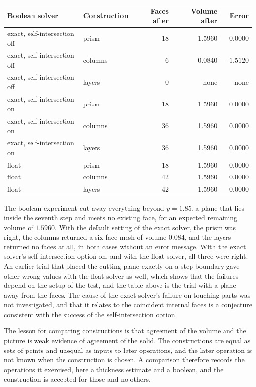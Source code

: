 \begin{center}
\small
\setlength{\tabcolsep}{4pt}
\begin{tabular}{llrrr}
\toprule
Boolean solver & Construction & Faces after & Volume after & Error\\
\midrule
exact, self-intersection off & prism & 18 & 1.5960 & 0.0000\\
exact, self-intersection off & columns & 6 & 0.0840 & $-1.5120$\\
exact, self-intersection off & layers & 0 & none & none\\
exact, self-intersection on & prism & 18 & 1.5960 & 0.0000\\
exact, self-intersection on & columns & 36 & 1.5960 & 0.0000\\
exact, self-intersection on & layers & 36 & 1.5960 & 0.0000\\
float & prism & 18 & 1.5960 & 0.0000\\
float & columns & 42 & 1.5960 & 0.0000\\
float & layers & 42 & 1.5960 & 0.0000\\
\bottomrule
\end{tabular}
\end{center}

The boolean experiment cut away everything beyond $y=1.85$, a plane that lies inside the seventh step and meets no existing face, for an expected remaining volume of $1.5960$. With the default setting of the exact solver, the prism was right, the columns returned a six-face mesh of volume $0.084$, and the layers returned no faces at all, in both cases without an error message. With the exact solver's self-intersection option on, and with the float solver, all three were right. An earlier trial that placed the cutting plane exactly on a step boundary gave other wrong values with the float solver as well, which shows that the failures depend on the setup of the test, and the table above is the trial with a plane away from the faces. The cause of the exact solver's failure on touching parts was not investigated, and that it relates to the coincident internal faces is a conjecture consistent with the success of the self-intersection option.

The lesson for comparing constructions is that agreement of the volume and the picture is weak evidence of agreement of the solid. The constructions are equal as sets of points and unequal as inputs to later operations, and the later operation is not known when the construction is chosen. A comparison therefore records the operations it exercised, here a thickness estimate and a boolean, and the construction is accepted for those and no others.

